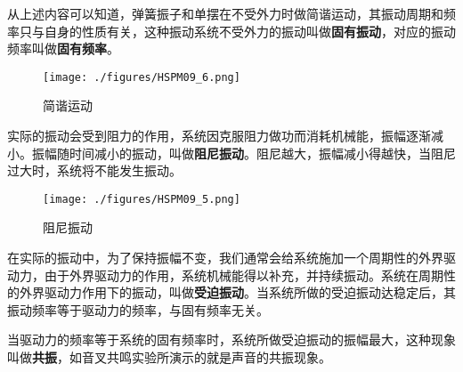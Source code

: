 从上述内容可以知道，弹簧振子和单摆在不受外力时做简谐运动，其振动周期和频率只与自身的性质有关，这种振动系统不受外力的振动叫做\textbf{固有振动}，对应的振动频率叫做\textbf{固有频率}。

\begin{figure}[ht]
\centering
\texttt{[image: ./figures/HSPM09\_6.png]}
\caption{简谐运动} \label{HSPM09_fig6}
\end{figure}


实际的振动会受到阻力的作用，系统因克服阻力做功而消耗机械能，振幅逐渐减小。振幅随时间减小的振动，叫做\textbf{阻尼振动}。阻尼越大，振幅减小得越快，当阻尼过大时，系统将不能发生振动。

\begin{figure}[ht]
\centering
\texttt{[image: ./figures/HSPM09\_5.png]}
\caption{阻尼振动} \label{HSPM09_fig5}
\end{figure}


在实际的振动中，为了保持振幅不变，我们通常会给系统施加一个周期性的外界驱动力，由于外界驱动力的作用，系统机械能得以补充，并持续振动。系统在周期性的外界驱动力作用下的振动，叫做\textbf{受迫振动}。当系统所做的受迫振动达稳定后，其振动频率等于驱动力的频率，与固有频率无关。

当驱动力的频率等于系统的固有频率时，系统所做受迫振动的振幅最大，这种现象叫做\textbf{共振}，如音叉共鸣实验所演示的就是声音的共振现象。

